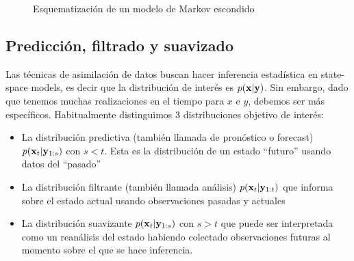 \begin{figure}[h]
    \centering
    \caption{Esquematización de un modelo de Markov escondido} \label{dia:hmm}
\end{figure}

\subsection{Predicción, filtrado y suavizado}

Las técnicas de asimilación de datos buscan hacer inferencia estadística en state-space models, es decir que la distribución de interés es $p(\mathbf{x} | \mathbf{y})$. Sin embargo, dado que tenemos muchas realizaciones en el tiempo para $x$ e $y$, debemos ser más específicos. Habitualmente distinguimos 3 distribuciones objetivo de interés:
\begin{itemize}
    \item La distribución predictiva (también llamada de pronóstico o forecast) $p(\mathbf{x}_t | \mathbf{y}_{1:s})$ con $s < t$. Esta es la distribución de un estado ``futuro'' usando datos del ``pasado''
    \item La distribución filtrante (también llamada análisis) $p(\mathbf{x}_t | \mathbf{y}_{1:t})$ que informa sobre el estado actual usando observaciones pasadas y actuales
    \item La distribución suavizante $p(\mathbf{x}_t | \mathbf{y}_{1:s})$ con $s > t$ que puede ser interpretada como un reanálisis del estado habiendo colectado observaciones futuras al momento sobre el que se hace inferencia.
\end{itemize}

